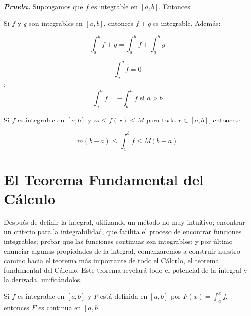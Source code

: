 \documentclass{report}
\begin{document}

    \textit{\textbf{Prueba.}} Supongamos que $f$ es integrable en $[a,b]$. Entonces

    \begin{thBox}
        Si $f$ y $g$ son integrables en $[a,b]$, entonces $f+g$ es integrable. Además:

        $$\int_{a}^{b}f+g = \int_{a}^{b}f + \int_{a}^{b}g$$
    \end{thBox}

    \begin{defBox}
        $$\int_{a}^{a}f = 0$$;
        $$\int_{a}^{b}f = - \int_{b}^{a}f \text{ si } a> b$$
    \end{defBox}

    \begin{thBox}
        Si $f$ es integrable en $[a,b]$ y $m\leq f(x) \leq M$ para todo $x \in [a,b]$, entonces:

        $$m(b-a) \leq \int_{a}^{b}f \leq M(b-a)$$
    \end{thBox}


    \section{El Teorema Fundamental del Cálculo}

    Después de definir la integral, utilizando un método no muy intuitivo; encontrar un criterio para la integrabilidad, que facilita el proceso de encontrar funciones integrables; probar que las funciones continuas son integrables; y por último enunciar algunas propiedades de la integral, comenzaremos a construir nuestro camino hacia el teorema más importante de todo el Cálculo, el teorema fundamental del Cálculo. Este teorema revelará todo el potencial de la integral y la derivada, unificándolos.

    \begin{thBox}
        Si $f$ es integrable en $[a,b]$ y $F$ está definida en $[a,b]$ por $F(x) = \int_{a}^{x}f$, entonces $F$ es continua en $[a,b]$.
    \end{thBox}

\end{document}
